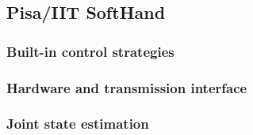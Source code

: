 \subsection{Pisa/IIT SoftHand}
\label{sec:softhand}

\subsubsection{Built-in control strategies}


\subsubsection{Hardware and transmission interface}


\subsubsection{Joint state estimation}